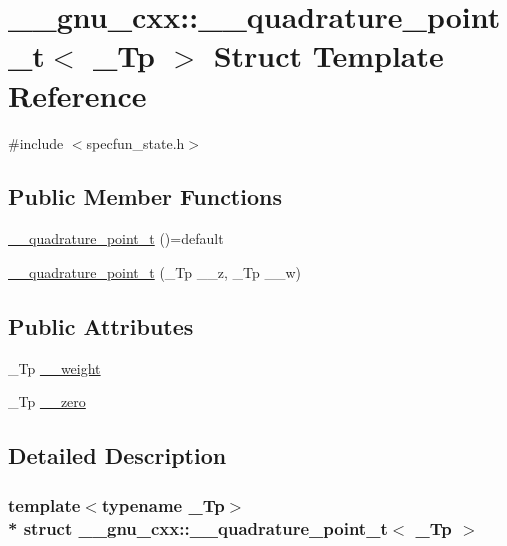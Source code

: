 \hypertarget{struct____gnu__cxx_1_1____quadrature__point__t}{}\section{\+\_\+\+\_\+gnu\+\_\+cxx\+:\+:\+\_\+\+\_\+quadrature\+\_\+point\+\_\+t$<$ \+\_\+\+Tp $>$ Struct Template Reference}
\label{struct____gnu__cxx_1_1____quadrature__point__t}


{\ttfamily \#include $<$specfun\+\_\+state.\+h$>$}

\subsection*{Public Member Functions}
\begin{DoxyCompactItemize}
\item 
\hyperlink{struct____gnu__cxx_1_1____quadrature__point__t_a77da59f678e286f58b484a4a1660ae32}{\+\_\+\+\_\+quadrature\+\_\+point\+\_\+t} ()=default
\item 
\hyperlink{struct____gnu__cxx_1_1____quadrature__point__t_a91907b974470c831d6e446987d5f60cb}{\+\_\+\+\_\+quadrature\+\_\+point\+\_\+t} (\+\_\+\+Tp \+\_\+\+\_\+z, \+\_\+\+Tp \+\_\+\+\_\+w)
\end{DoxyCompactItemize}
\subsection*{Public Attributes}
\begin{DoxyCompactItemize}
\item 
\+\_\+\+Tp \hyperlink{struct____gnu__cxx_1_1____quadrature__point__t_a231e04e186e8e45b431876cc958a81c2}{\+\_\+\+\_\+weight}
\item 
\+\_\+\+Tp \hyperlink{struct____gnu__cxx_1_1____quadrature__point__t_a9fe76d952db0e4c8a10f81da8c811719}{\+\_\+\+\_\+zero}
\end{DoxyCompactItemize}


\subsection{Detailed Description}
\subsubsection*{template$<$typename \+\_\+\+Tp$>$\\*
struct \+\_\+\+\_\+gnu\+\_\+cxx\+::\+\_\+\+\_\+quadrature\+\_\+point\+\_\+t$<$ \+\_\+\+Tp $>$}


